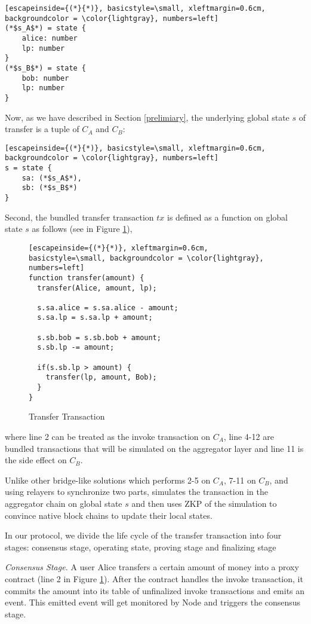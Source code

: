 \begin{lstlisting}[escapeinside={(*}{*)}, basicstyle=\small, xleftmargin=0.6cm, backgroundcolor = \color{lightgray}, numbers=left]
(*$s_A$*) = state {
    alice: number
    lp: number
}
(*$s_B$*) = state {
    bob: number
    lp: number
}
\end{lstlisting}

Now, as we have described in Section \ref{prelimiary}, the underlying global state $s$ of transfer is a tuple of $C_A$ and $C_B$:
\begin{lstlisting}[escapeinside={(*}{*)}, basicstyle=\small, xleftmargin=0.6cm, backgroundcolor = \color{lightgray}, numbers=left]
s = state {
    sa: (*$s_A$*),
    sb: (*$s_B$*)
}
\end{lstlisting}

Second, the bundled transfer transaction $tx$ is defined as a function on global state $s$ as follows (see in Figure \ref{fg:transfer}),
\begin{figure}[!ht]
\begin{lstlisting}[escapeinside={(*}{*)}, xleftmargin=0.6cm, basicstyle=\small, backgroundcolor = \color{lightgray}, numbers=left]
function transfer(amount) {
  transfer(Alice, amount, lp);
  
  s.sa.alice = s.sa.alice - amount;
  s.sa.lp = s.sa.lp + amount;
  
  s.sb.bob = s.sb.bob + amount;
  s.sb.lp -= amount;
  
  if(s.sb.lp > amount) {
    transfer(lp, amount, Bob);
  }
}
\end{lstlisting}
\caption{Transfer Transaction}
\label{fg:transfer}
\end{figure}
where line 2 can be treated as the invoke transaction on $C_A$, line 4-12 are bundled transactions that will be simulated on the aggregator layer and line 11 is the side effect on $C_B$.

Unlike other bridge-like solutions which performs 2-5 on $C_A$, 7-11 on $C_B$, and using relayers to synchronize two parts, \dprotocol simulates the transaction in the aggregator chain on global state $s$ and then uses ZKP of the simulation to convince native block chains to update their local states.

In our protocol, we divide the life cycle of the transfer transaction into four stages: consensus stage, operating state, proving stage and finalizing stage



\smallskip\noindent\emph{Consensus Stage.}
A user Alice transfers a certain amount of money into a proxy contract (line 2 in Figure \ref{fg:transfer}). After the contract handles the invoke transaction, it commits the amount into its table of unfinalized invoke transactions and emits an event. This emitted event will get monitored by \dprotocol Node and triggers the consensus stage.

